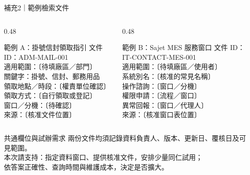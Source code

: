 \documentclass[aspectratio=169,12pt]{beamer}
\begin{document}
\begin{frame}{補充2｜範例檢索文件}
\footnotesize
\begin{columns}[T,onlytextwidth]
\begin{column}{0.48\textwidth}
\begin{block}{範例 A：掛號信封領取指引}
文件 ID：ADM-MAIL-001\\
適用範圍：〔待填廠區／部門〕\\
關鍵字：掛號、信封、郵務用品\\
領取地點／時段：〔權責單位確認〕\\
領取方式：〔自行領取或登記〕\\
窗口／分機：〔待確認〕\\
來源：〔核准文件位置〕
\end{block}
\end{column}
\begin{column}{0.48\textwidth}
\begin{block}{範例 B：Sajet MES 服務窗口}
文件 ID：IT-CONTACT-MES-001\\
適用範圍：〔待填廠區／使用者〕\\
系統別名：〔核准的常見名稱〕\\
操作諮詢：〔窗口／分機〕\\
權限申請：〔流程／窗口〕\\
異常回報：〔窗口／代理人〕\\
來源：〔核准窗口表位置〕
\end{block}
\end{column}
\end{columns}
\begin{alertblock}{共通欄位與試辦需求}
兩份文件均須記錄資料負責人、版本、更新日、覆核日及可見範圍。\\
本次請支持：指定資料窗口、提供核准文件，安排少量同仁試用；\\
依答案正確性、查詢時間與維護成本，決定是否擴大。
\end{alertblock}
\end{frame}
\end{document}
